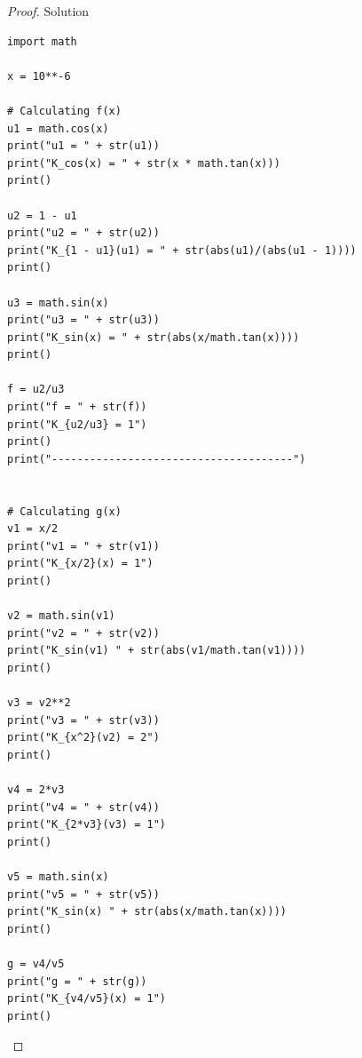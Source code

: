 \documentclass{article}
\theoremstyle{definition}
\begin{document}
\begin{proof}{Solution}
\begin{lstlisting}
import math

x = 10**-6

# Calculating f(x)
u1 = math.cos(x)
print("u1 = " + str(u1))
print("K_cos(x) = " + str(x * math.tan(x)))
print()

u2 = 1 - u1
print("u2 = " + str(u2))
print("K_{1 - u1}(u1) = " + str(abs(u1)/(abs(u1 - 1))))
print()

u3 = math.sin(x)
print("u3 = " + str(u3))
print("K_sin(x) = " + str(abs(x/math.tan(x))))
print()

f = u2/u3
print("f = " + str(f))
print("K_{u2/u3} = 1")
print()
print("--------------------------------------")


# Calculating g(x)
v1 = x/2
print("v1 = " + str(v1))
print("K_{x/2}(x) = 1")
print()

v2 = math.sin(v1)
print("v2 = " + str(v2))
print("K_sin(v1) " + str(abs(v1/math.tan(v1))))
print()

v3 = v2**2
print("v3 = " + str(v3))
print("K_{x^2}(v2) = 2")
print()

v4 = 2*v3
print("v4 = " + str(v4))
print("K_{2*v3}(v3) = 1")
print()

v5 = math.sin(x)
print("v5 = " + str(v5))
print("K_sin(x) " + str(abs(x/math.tan(x))))
print()

g = v4/v5
print("g = " + str(g))
print("K_{v4/v5}(x) = 1")
print()
\end{lstlisting}

\end{proof}
\end{document}
